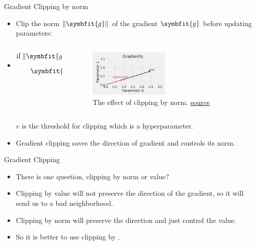 \begin{frame}{Gradient Clipping by norm}
	\begin{itemize}
		\item Clip the norm $\|\symbfit{g}\|$ of the gradient $\symbfit{g}$ before updating parameters:
		\item[]
		\begin{columns}
			\centering
			\begin{column}{0.4\textwidth}
				\centering
				\[
				\begin{aligned}
					&\text{if} \; \|\symbfit{g}\| > v:\\
					&\qquad \symbfit{g} \gets \frac{\symbfit g}{\|\symbfit g\|} v
				\end{aligned}
				\]
			\end{column}
			\begin{column}{0.6\textwidth}
				\begin{figure}[H]
					\centering
					\includegraphics[width=0.5\textwidth]{Images/clip-by-norm.png}
					\caption{The effect of clipping by norm. \href{https://github.com/dvgodoy/PyTorchStepByStep/blob/master/ChapterExtra.ipynb}{source}}
				\end{figure}
			\end{column}
		\end{columns}
		
		$v$ is the threshold for clipping which is a hyperparameter.
		\item Gradient clipping saves the direction of gradient and controls its norm.
	\end{itemize}
\end{frame}

\begin{frame}{Gradient Clipping}
	\begin{itemize}
		\item There is one question, clipping by norm or value?
		\pause
		\item Clipping by value will not preserve the direction of the gradient, so it will send us to a bad neighborhood.
		\item Clipping by norm will preserve the direction and just control the value.
		\item So it is better to use clipping by .
	\end{itemize}
\end{frame}

